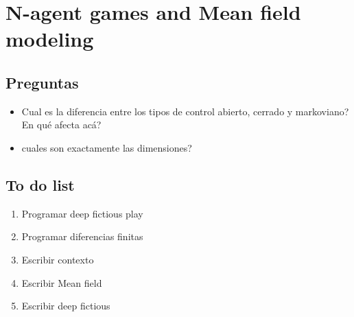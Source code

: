 \documentclass{article}
\begin{document}
\section*{N-agent games and Mean field modeling}
	\subsection*{Preguntas}
\begin{itemize}
	\item Cual es la diferencia entre los tipos de control abierto, cerrado y markoviano? En qué afecta acá?
	\item cuales son exactamente las dimensiones?
\end{itemize}
\subsection*{To do list}
\begin{enumerate}
	\item Programar deep fictious play
	\item Programar diferencias finitas
	\item Escribir contexto
	\item Escribir Mean field
	\item Escribir deep fictious
\end{enumerate}
\printbibliography
\end{document}
